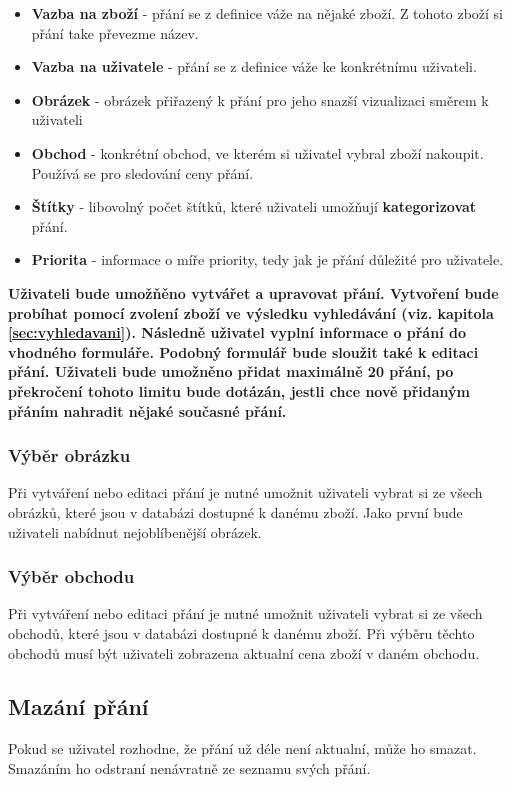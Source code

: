 \begin{itemize}
\item \textbf{Vazba na zboží} - přání se z definice váže na nějaké zboží. Z tohoto zboží si přání take převezme název.
\item \textbf{Vazba na uživatele} - přání se z definice váže ke konkrétnímu uživateli.
\item \textbf{Obrázek} - obrázek přiřazený k přání pro jeho snazší vizualizaci směrem k uživateli
\item \textbf{Obchod} - konkrétní obchod, ve kterém si uživatel vybral zboží nakoupit. Používá se pro sledování ceny přání.
\item \textbf{Štítky} - libovolný počet štítků, které uživateli umožňují \textbf{kategorizovat} přání.
\item \textbf{Priorita} - informace o míře priority, tedy jak je přání důležité pro uživatele.
\end{itemize}

\textbf{Uživateli bude umožňěno vytvářet a upravovat přání. Vytvoření bude probíhat pomocí zvolení zboží ve výsledku vyhledávání (viz. kapitola \ref{sec:vyhledavani}). Následně uživatel vyplní informace o přání do vhodného formuláře. Podobný formulář bude sloužit také k editaci přání. Uživateli bude umožněno přidat maximálně 20 přání, po překročení tohoto limitu bude dotázán, jestli chce nově přidaným přáním nahradit nějaké současné přání.}

\subsubsection{Výběr obrázku}
Při vytváření nebo editaci přání je nutné umožnit uživateli vybrat si ze všech obrázků, které jsou v databázi dostupné k danému zboží. Jako první bude uživateli nabídnut nejoblíbenější obrázek.

\subsubsection{Výběr obchodu}
Při vytváření nebo editaci přání je nutné umožnit uživateli vybrat si ze všech obchodů, které jsou v databázi dostupné k danému zboží. Při výběru těchto obchodů musí být uživateli zobrazena aktualní cena zboží v daném obchodu.

\subsection{Mazání přání}
Pokud se uživatel rozhodne, že přání už déle není aktualní, může ho smazat. Smazáním ho odstraní nenávratně ze seznamu svých přání.

